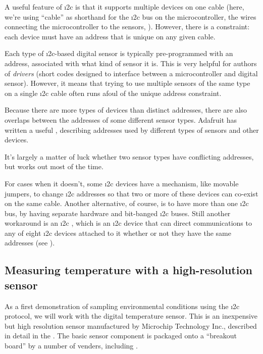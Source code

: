 A useful feature of \i2c is that it supports multiple devices on one cable (here, we're using ``cable'' as shorthand for the \i2c bus on the microcontroller, the wires connecting the microcontroller to the sensors, \etc).
However, there is a constraint: each device must have an address that is unique on any given cable.

Each type of \i2c-based digital sensor is typically pre-programmed with an address, associated with what kind of sensor it is.
This is very helpful for authors of \emph{drivers} (short codes designed to interface between a microcontroller and digital sensor).
However, it means that trying to use multiple sensors of the same type on a single \i2c cable often runs afoul of the unique address constraint.

Because there are more types of devices than distinct addresses, there are also overlaps between the addresses of some different sensor types.
Adafruit has written a useful , describing addresses used by different types of sensors and other devices.


It's largely a matter of luck whether two sensor types have conflicting addresses, but works out most of the time.

For cases when it doesn't, some \i2c devices have a mechanism, like movable jumpers, to change \i2c addresses so that two or more of these devices can co-exist on the same cable.
Another alternative, of course, is to have more than one \i2c bus, \eg by having separate hardware and bit-banged \i2c buses.
Still another workaround is an \i2c , which is an \i2c device that can direct communications to any of eight \i2c devices attached to it whether or  not they have the same addresses (see ).

\subsection{ Measuring temperature with a high-resolution sensor }
As a first demonstration of sampling environmental conditions using the \i2c protocol, we will work with the  digital temperature sensor.
This is an inexpensive but high resolution sensor manufactured by Microchip Technology Inc., described in detail in the .
The basic sensor component is packaged onto a ``breakout board'' by a number of venders, including .

